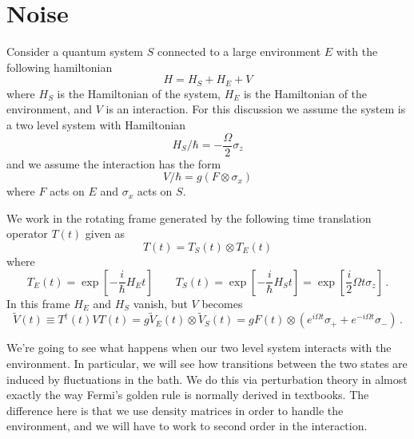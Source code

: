 \section{Noise}

Consider a quantum system $S$ connected to a large environment $E$ with the following hamiltonian
\begin{equation}
H = H_S + H_E + V
\end{equation}
where $H_S$ is the Hamiltonian of the system, $H_E$ is the Hamiltonian of the environment, and $V$ is an interaction.
For this discussion we assume the system is a two level system with Hamiltonian
\begin{equation}
H_S / \hbar = - \frac{\Omega}{2} \sigma_z
\end{equation}
and we assume the interaction has the form
\begin{equation}
V / \hbar = g \left( F \otimes \sigma_x \right)
\end{equation}
where $F$ acts on $E$ and $\sigma_x$ acts on $S$.

We work in the rotating frame generated by the following time translation operator $T(t)$ given as
\begin{equation}
T(t) = T_S(t) \otimes T_E(t)
\end{equation}
where
\begin{equation}
T_E(t) = \exp \left[ - \frac{i}{\hbar} H_E t \right]
\qquad
T_S(t)
= \exp \left[ - \frac{i}{\hbar} H_S t \right]
= \exp \left[ \frac{i}{2} \Omega t \sigma_z \right] \, .
\end{equation}
In this frame $H_E$ and $H_S$ vanish, but $V$ becomes
\begin{equation}
\tilde{V}(t)
\equiv T^\dagger(t) V T(t)
= g \tilde{V}_E(t) \otimes \tilde{V}_S(t)
= g
F(t)
\otimes \left( e^{i \Omega t}\sigma_+ + e^{-i \Omega t} \sigma_- \right) \, .
\end{equation}

We're going to see what happens when our two level system interacts with the environment.
In particular, we will see how transitions between the two states are induced by fluctuations in the bath.
We do this via perturbation theory in almost exactly the way Fermi's golden rule is normally derived in textbooks.
The difference here is that we use density matrices in order to handle the environment, and we will have to work to second order in the interaction.

